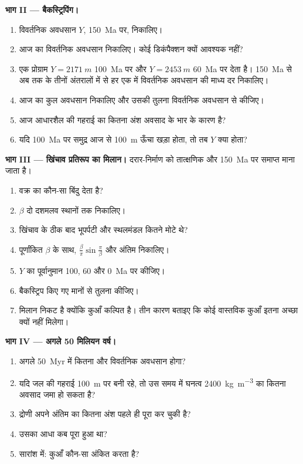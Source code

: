 \begin{problem}[{सप्ताहांत समस्या --- किसी कुएँ का बैकस्ट्रिपिंग}]
\noindent\textbf{भाग II --- बैकस्ट्रिपिंग।}
\begin{enumerate}[resume]
  \item विवर्तनिक अवधसान $Y$, \qty{150}{Ma} पर, निकालिए।
  \item आज का विवर्तनिक अवधसान निकालिए। कोई डिकंपैक्शन क्यों आवश्यक नहीं?
  \item एक प्रोग्राम $Y = \qty{2171}{m}$ \qty{100}{Ma} पर और $Y = \qty{2453}{m}$
        \qty{60}{Ma} पर देता है। \qty{150}{Ma} से अब तक के तीनों
        अंतरालों में से हर एक में विवर्तनिक अवधसान की माध्य दर निकालिए।
  \item आज का कुल अवधसान निकालिए और उसकी तुलना विवर्तनिक अवधसान से कीजिए।
  \item आज आधारशैल की गहराई का कितना अंश अवसाद के भार के कारण है?
  \item यदि \qty{100}{Ma} पर समुद्र आज से \qty{100}{m} ऊँचा खड़ा होता, तो तब $Y$
        क्या होता?
\end{enumerate}

\noindent\textbf{भाग III --- खिंचाव प्रतिरूप का मिलान।} दरार-निर्माण को तात्क्षणिक
और \qty{150}{Ma} पर समाप्त माना जाता है।
\begin{enumerate}[resume]
  \item वक्र का कौन-सा बिंदु  देता है?
  \item {} $\beta$ दो दशमलव स्थानों तक निकालिए।
  \item खिंचाव के ठीक बाद भूपर्पटी और स्थलमंडल कितने मोटे थे?
  \item पूर्णांकित $\beta$ के साथ, $\frac{\beta}{\pi}\sin\frac{\pi}{\beta}$ और अंतिम
         निकालिए।
  \item $Y$ का पूर्वानुमान 100, 60 और \qty{0}{Ma} पर कीजिए।
  \item बैकस्ट्रिप किए गए मानों से तुलना कीजिए।
  \item मिलान निकट है क्योंकि कुआँ कल्पित है। तीन कारण बताइए कि कोई वास्तविक कुआँ
        इतना अच्छा क्यों नहीं मिलेगा।
\end{enumerate}

\noindent\textbf{भाग IV --- अगले 50 मिलियन वर्ष।}
\begin{enumerate}[resume]
  \item अगले \qty{50}{Myr} में कितना और विवर्तनिक अवधसान होगा?
  \item यदि जल की गहराई \qty{100}{m} पर बनी रहे, तो उस समय में घनत्व
        \qty{2400}{kg.m^{-3}} का कितना अवसाद जमा हो सकता है?
  \item द्रोणी अपने अंतिम  का कितना अंश पहले ही पूरा कर चुकी है?
  \item उसका आधा कब पूरा हुआ था?
  \item सारांश में: कुआँ कौन-सा  अंकित करता है?
\end{enumerate}
\end{problem}
